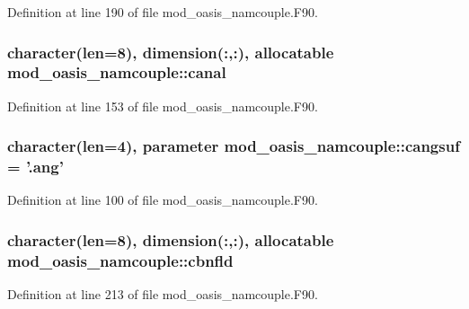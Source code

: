 Definition at line 190 of file mod\+\_\+oasis\+\_\+namcouple.\+F90.

\hypertarget{classmod__oasis__namcouple_a5eaa67fd4db1a3cde074adedd984ffbe}{
\subsubsection[{canal}]{\setlength{\rightskip}{0pt plus 5cm}character(len=8), dimension(\+:,\+:), allocatable mod\+\_\+oasis\+\_\+namcouple\+::canal\hspace{0.3cm}{\ttfamily [private]}}}\label{classmod__oasis__namcouple_a5eaa67fd4db1a3cde074adedd984ffbe}


Definition at line 153 of file mod\+\_\+oasis\+\_\+namcouple.\+F90.

\hypertarget{classmod__oasis__namcouple_a4b921aeee4d921557ab0cd2f0e541dad}{
\subsubsection[{cangsuf}]{\setlength{\rightskip}{0pt plus 5cm}character(len=4), parameter mod\+\_\+oasis\+\_\+namcouple\+::cangsuf = '.ang'\hspace{0.3cm}{\ttfamily [private]}}}\label{classmod__oasis__namcouple_a4b921aeee4d921557ab0cd2f0e541dad}


Definition at line 100 of file mod\+\_\+oasis\+\_\+namcouple.\+F90.

\hypertarget{classmod__oasis__namcouple_af5bfb0fe58a77461130b9967fa7a4d5e}{
\subsubsection[{cbnfld}]{\setlength{\rightskip}{0pt plus 5cm}character(len=8), dimension(\+:,\+:), allocatable mod\+\_\+oasis\+\_\+namcouple\+::cbnfld\hspace{0.3cm}{\ttfamily [private]}}}\label{classmod__oasis__namcouple_af5bfb0fe58a77461130b9967fa7a4d5e}


Definition at line 213 of file mod\+\_\+oasis\+\_\+namcouple.\+F90.

